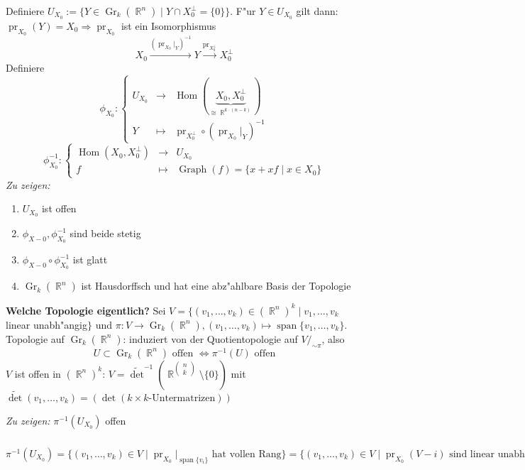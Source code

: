 \documentclass[paper=A4, twoside, chapterprefix=true, bibliography=totoc, headsepline]{scrbook}
\let\temp\phi{}
\let\phi\varphi{}
\let\varphi\temp{}
\let\temp\theta{}
\let\theta\vartheta{}
\let\vartheta\temp{}
\let\temp\epsilon{}
\let\epsilon\varepsilon{}
\let\varepsilon\temp{}
\let\temp\rho{}
\let\rho\varrho{}
\let\varrho\temp{}
\DeclareMathOperator{\R}{\mathbb{R}}
\DeclareMathOperator{\mspan}{span}  %
\DeclareMathOperator{\pr}{pr}
\DeclareMathOperator{\Gr}{Gr}
\DeclareMathOperator{\Graph}{Graph}
\DeclareMathOperator{\Hom}{Hom}     %
\newcommand{\modulo}[1]{\ensuremath{/_{\displaystyle #1}}}
\theoremstyle{plain}
\theoremstyle{nonumberplain}
\theoremstyle{empty}
\theoremstyle{break}
\begin{document}
Definiere $U_{X_0} := \{Y \in \Gr_k(\R^n) \mid Y \cap X_0^\perp = \{0\}\}$. F"ur $Y \in U_{X_0}$ gilt dann: $\pr_{X_0}(Y) = X_0 \Rightarrow \pr_{X_0}$ ist ein Isomorphismus
	\[X_0 \xrightarrow{(\pr_{X_0}|_Y)^{-1}} Y \xrightarrow{\pr_{X_0^\perp}} X_0^\perp \]
Definiere
	\[ \varphi_{X_0}: \left\{\begin{array}{ccl} U_{X_0} &\to& \Hom(\underbrace{X_0, X_0^\perp}_{\cong \R^{k \cdot (n-k)}}) \\
		Y &\mapsto& \pr_{X_0^\perp} \circ (\pr_{X_0}|_Y)^{-1} \end{array}\right.\]
	\[ \varphi_{X_0}^{-1}: \left\{\begin{array}{ccl} \Hom(X_0, X_0^\perp) &\to& U_{X_0} \\
		f &\mapsto& \Graph(f) = \{x + xf \mid x \in X_0\} \end{array}\right.\]
\emph{Zu zeigen:}\begin{enumerate}
\item
	$U_{X_0}$ ist offen
\item
	$\varphi_{X-0}, \varphi_{X_0}^{-1}$ sind beide stetig
\item
	$\varphi_{X-0} \circ \varphi_{X_0}^{-1}$ ist glatt
\item
	$\Gr_k(\R^n)$ ist Hausdorffsch und hat eine abz"ahlbare Basis der Topologie
\end{enumerate}

\textbf{Welche Topologie eigentlich?} Sei $V = \{ (v_1,\ldots, v_k) \in (\R^n)^k \mid v_1,\ldots, v_k$ linear unabh"angig$\}$ und $\pi: V \to \Gr_k(\R^n), (v_1,\ldots ,v_k) \mapsto \mspan\{v_1,\ldots ,v_k\}$. Topologie auf $\Gr_k(\R^n)$: induziert von der Quotientopologie auf $V\modulo{\sim\pi}$, also
	\[U \subset \Gr_k(\R^n) \text{ offen } \Leftrightarrow \pi^{-1}(U) \text{ offen} \]
$V$ ist offen in $(\R^n)^k$: $V = \widetilde{\det}^{-1}(\R^{\left(\begin{smallmatrix}n \\ k\end{smallmatrix}\right)} \setminus \{0\})$ mit $\widetilde{\det}(v_1,\ldots,v_k) = (\det(k \times k\text{-Untermatrizen}))$

\emph{Zu zeigen:} $\pi^{-1}(U_{X_0})$ offen

$\pi^{-1}(U_{X_0}) = \{(v_1,\ldots ,v_k) \in V \mid \pr_{X_0}|_{\mspan\{v_i\}} \text{ hat vollen Rang}\} = \{(v_1,\ldots ,v_k) \in V \mid \pr_{X_0}(V-i) \text{ sind linear unabh"angig} \} = (\widetilde{\det} \circ (\pr_{X_0},\ldots ,\pr_{X_0}))^{-1}(\R^{\left(\begin{smallmatrix}n \\ k\end{smallmatrix}\right)} \setminus \{0\})$
\end{document}
